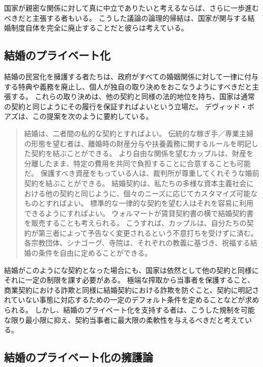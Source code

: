\documentclass[paper=a4,book,openany]{jlreq}
\begin{document}
国家が親密な関係に対して真に中立でありたいと考えるならば、さらに一歩進むべきだと主張する者もいる。
こうした議論の論理的帰結は、国家が関与する結婚制度自体を完全に廃止することだと彼らは考えている。

\subsection{結婚のプライベート化}

結婚の民営化を擁護する者たちは、政府がすべての婚姻関係に対して一律に付与する特典や義務を廃止し、個人が独自の取り決めをおこなうようにすべきだと主張する。
これらの取り決めは、他の契約と同様の法的地位を持ち、国家は通常の契約と同じようにその履行を保証すればよいという立場だ。
デヴィッド・ボアズは、この提案を次のように要約している。

\begin{quote}
結婚は、二者間の私的な契約とすればよい。
伝統的な稼ぎ手／専業主婦の形態を望む者は、離婚時の財産分与や扶養義務に関するルールを明記した契約を結ぶことができる。
より自由な関係を望むカップルは、財産を分離したまま、特定の費用を共同で負担することに合意することも可能だ。
保護すべき資産をもっている人は、裁判所が尊重してくれそうな婚前契約を結ぶことができる。
結婚契約は、私たちの多様な資本主義社会における他の契約と同じように、個々のニーズに応じてカスタマイズ可能なものとすればよい。
標準的な一律的な契約を望む人はそれを容易に利用できるようにすればよい。
ウォルマートが賃貸契約書の横で結婚契約書を販売することも考えられる。
こうすれば、カップルは、自分たちの契約が第三者によって予告なく変更されるという不意打ちを受けずに済む。
各宗教団体、シナゴーグ、寺院は、それぞれの教義に基づき、祝福する結婚の条件を自由に定めることができる。
\citep{boaz97:_privat_marriag}

\end{quote}

結婚がこのようにな契約となった場合にも、国家は依然として他の契約と同様にそれに一定の制限を課す必要がある。
極端な搾取から当事者を保護すること、商業契約における詐欺と同様に結婚契約における詐欺を防ぐこと、契約に明記されていない事態に対応するための一定のデフォルト条件を定めることなどが求められる。
しかし、結婚のプライベート化を支持する者は、こうした規制を可能な限り最小限に抑え、契約当事者に最大限の柔軟性を与えるべきだと考えている。

\subsection{結婚のプライベート化の擁護論}
\end{document}
